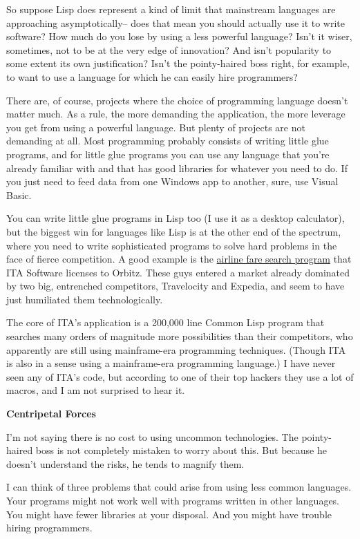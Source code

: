 \documentclass[12pt]{book}
\begin{document}
So suppose Lisp does represent a kind of limit that mainstream languages
are approaching asymptotically-- does that mean you should actually use
it to write software? How much do you lose by using a less powerful
language? Isn't it wiser, sometimes, not to be at the very edge of
innovation? And isn't popularity to some extent its own justification?
Isn't the pointy-haired boss right, for example, to want to use a
language for which he can easily hire programmers?

There are, of course, projects where the choice of programming language
doesn't matter much. As a rule, the more demanding the application, the
more leverage you get from using a powerful language. But plenty of
projects are not demanding at all. Most programming probably consists of
writing little glue programs, and for little glue programs you can use
any language that you're already familiar with and that has good
libraries for whatever you need to do. If you just need to feed data
from one Windows app to another, sure, use Visual Basic.

You can write little glue programs in Lisp too (I use it as a desktop
calculator), but the biggest win for languages like Lisp is at the other
end of the spectrum, where you need to write sophisticated programs to
solve hard problems in the face of fierce competition. A good example is
the \href{carl.html}{airline fare search program} that ITA Software
licenses to Orbitz. These guys entered a market already dominated by two
big, entrenched competitors, Travelocity and Expedia, and seem to have
just humiliated them technologically.

The core of ITA's application is a 200,000 line Common Lisp program that
searches many orders of magnitude more possibilities than their
competitors, who apparently are still using mainframe-era programming
techniques. (Though ITA is also in a sense using a mainframe-era
programming language.) I have never seen any of ITA's code, but
according to one of their top hackers they use a lot of macros, and I am
not surprised to hear it.

\textbf{Centripetal Forces}

I'm not saying there is no cost to using uncommon technologies. The
pointy-haired boss is not completely mistaken to worry about this. But
because he doesn't understand the risks, he tends to magnify them.

I can think of three problems that could arise from using less common
languages. Your programs might not work well with programs written in
other languages. You might have fewer libraries at your disposal. And
you might have trouble hiring programmers.
\end{document}
